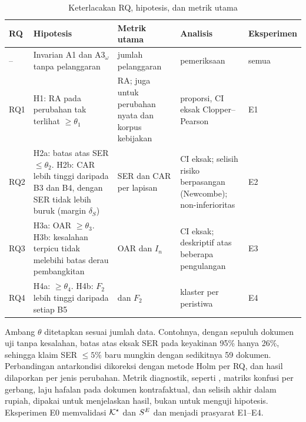 \begin{table}[t]
\centering
\caption{Keterlacakan RQ, hipotesis, dan metrik utama}
\label{tab:lacak}
\scriptsize
\begin{tabularx}{\textwidth}{@{}P{0.8cm} L P{3.6cm} P{3.4cm} P{1.1cm}@{}}
\toprule
\textbf{RQ} & \textbf{Hipotesis} & \textbf{Metrik utama} & \textbf{Analisis} & \textbf{Eksperimen} \\
\midrule
-- & Invarian A1 dan A3$_\omega$ tanpa pelanggaran & jumlah pelanggaran & pemeriksaan & semua \\
RQ1 & H1: RA pada perubahan tak terlihat $\geq \theta_1$ & RA; juga untuk perubahan nyata dan korpus kebijakan & proporsi, CI eksak Clopper--Pearson & E1 \\
RQ2 & H2a: batas atas SER $\leq \theta_2$. H2b: CAR lebih tinggi daripada B3 dan B4, dengan SER tidak lebih buruk (margin $\delta_S$) & SER dan CAR per lapisan & CI eksak; selisih risiko berpasangan (Newcombe); non-inferioritas & E2 \\
RQ3 & H3a: OAR $\geq \theta_3$. H3b: kesalahan terpicu tidak melebihi batas derau pembangkitan & OAR dan $I_n$ & CI eksak; deskriptif atas beberapa pengulangan & E3 \\
RQ4 & H4a:  $\geq \theta_4$. H4b: $F_2$ lebih tinggi daripada setiap B5 &  dan $F_2$ &  klaster per peristiwa & E4 \\
\bottomrule
\end{tabularx}
\end{table}

Ambang $\theta$ ditetapkan sesuai jumlah data. Contohnya, dengan sepuluh dokumen uji tanpa kesalahan, batas atas eksak SER pada keyakinan 95\% hanya 26\%, sehingga klaim SER $\leq 5\%$ baru mungkin dengan sedikitnya 59 dokumen. Perbandingan antarkondisi dikoreksi dengan metode Holm per RQ, dan hasil dilaporkan per jenis perubahan. Metrik diagnostik, seperti , matriks konfusi per gerbang, laju hafalan pada dokumen kontrafaktual, dan selisih akhir dalam rupiah, dipakai untuk menjelaskan hasil, bukan untuk menguji hipotesis. Eksperimen E0 memvalidasi $\mathcal{K}^{\star}$ dan $S^{E}$ dan menjadi prasyarat E1--E4.
